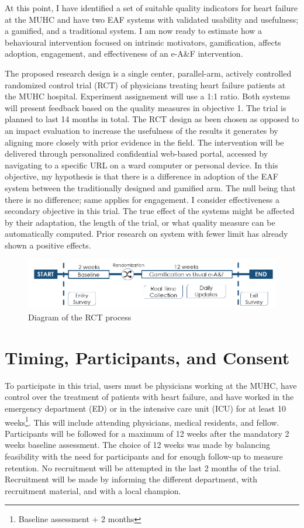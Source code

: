 At this point, I have identified a set of suitable quality indicators for heart failure at the MUHC and have two \gls{EAF} systems with validated usability and usefulness; a gamified, and a traditional system. I am now ready to estimate how a behavioural intervention focused on intrinsic motivators, gamification, affects adoption, engagement, and effectiveness of an e-A\&F intervention.

The proposed research design is a single center, parallel-arm, actively controlled randomized control trial (\gls{RCT}) of physicians treating heart failure patients at the \gls{MUHC} hospital. Experiment assignement will use a 1:1 ratio. Both systems will present feedback based on the quality measures in objective 1. The trial is planned to last 14 months in total. The RCT design as been chosen as opposed to an impact evaluation to increase the usefulness of the results it generates by aligning more closely with prior evidence in the field. The intervention will be delivered through personalized confidential web-based portal, accessed by navigating to a specific URL on a ward computer or personal device. In this objective, my hypothesis is that there is a difference in adoption of the \gls{EAF} system between the traditionally designed and gamified arm. The null being that there is no difference; same applies for engagement. I consider effectiveness a secondary objective in this trial. The true effect of the systems might be affected by their adaptation, the length of the trial, or what quality measure can be automatically computed. Prior research on system with fewer limit has already shown a positive effects.

\begin{figure}[h]
    \centering
    \includegraphics[width=\textwidth]{img/rct_flow.png}
    \caption{Diagram of the RCT process}
    \label{fig:rct_flow}
\end{figure}

\section{Timing, Participants, and Consent}
To participate in this trial, users must be physicians working at the MUHC, have control over the treatment of patients with heart failure, and have worked in the emergency department (ED) or in the intensive care unit (ICU) for at least 10 weeks\footnote{Baseline assessment + 2 months}. This will include attending physicians, medical residents, and fellow. Participants will be followed for a maximum of 12 weeks after the mandatory 2 weeks baseline assessment. The choice of 12 weeks was made by balancing feasibility with the need for participants and for enough follow-up to measure retention. No recruitment will be attempted in the last 2 months of the trial. Recruitment will be made by informing the different department, with recruitment material, and with a local champion.

